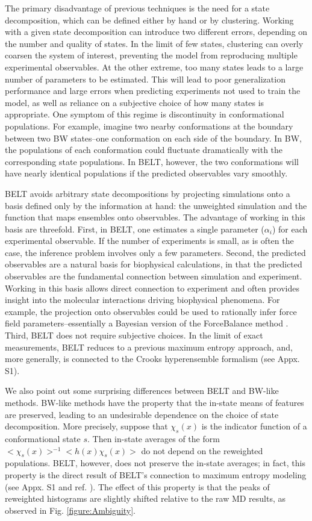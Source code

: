 \documentclass[journal=jacsat,manuscript=article]{achemso}
\begin{document}
The primary disadvantage of previous techniques is the need for a state decomposition, which can be defined either by hand or by clustering.  Working with a given state decomposition can introduce two different errors, depending on the number  and quality of states.  In the limit of few states, clustering can overly coarsen the system of interest, preventing the model from reproducing multiple experimental observables.  At the other extreme, too many states leads to a large number of parameters to be estimated. This will lead to poor generalization performance and large errors when predicting experiments not used to train the model, as well as reliance on a subjective choice of how many states is appropriate.  One symptom of this regime is discontinuity in conformational populations. For example, imagine two nearby conformations at the boundary between two BW states--one conformation on each side of the boundary.  In BW, the populations of each conformation could fluctuate dramatically with the 
corresponding 
state populations.  In BELT, however, the two conformations will have nearly identical populations if the predicted observables vary smoothly.

BELT avoids arbitrary state decompositions by projecting simulations onto a basis defined only by the information at hand: the unweighted simulation and the function that maps ensembles onto observables.  The advantage of working in this basis are threefold. First, in BELT, one estimates a single parameter ($\alpha_i$) for each experimental observable.  If the number of experiments is small, as is often the case, the inference problem involves only a few parameters.  Second, the predicted observables are a natural basis for biophysical calculations, in that the predicted observables are the fundamental connection between simulation and experiment.  Working in this basis allows direct connection to experiment and often provides insight into the molecular interactions driving biophysical phenomena.  For example, the projection onto observables could be used to rationally infer force field parameters--essentially a Bayesian version of the ForceBalance method  \cite{wang2012, wang2013systematic}.  Third, BELT 
does not require subjective choices.  In the limit of exact measurements, BELT reduces to a previous  \cite{chodera2012} maximum entropy approach, and, more generally, is connected to the Crooks hyperensemble formalism (see Appx. S1).  

We also point out some surprising differences between BELT and BW-like methods.  BW-like methods have the property that the in-state means of features are preserved, leading to an undesirable dependence on the choice of state decomposition.  More precisely, suppose that $\chi_s(x)$ is the indicator function of a conformational state $s$.  Then in-state averages of the form $<\chi_s(x)>^{-1} <h(x) \chi_s(x)>$ do not depend on the reweighted populations.  BELT, however, does not preserve the in-state averages; in fact, this property is the direct result of BELT's connection to maximum entropy modeling (see Appx. S1 and ref.  \cite{chodera2012}).  The effect of this property is that the peaks of reweighted histograms are slightly shifted relative to the raw MD results, as observed in Fig. \ref{figure:Ambiguity}.   
\end{document}
